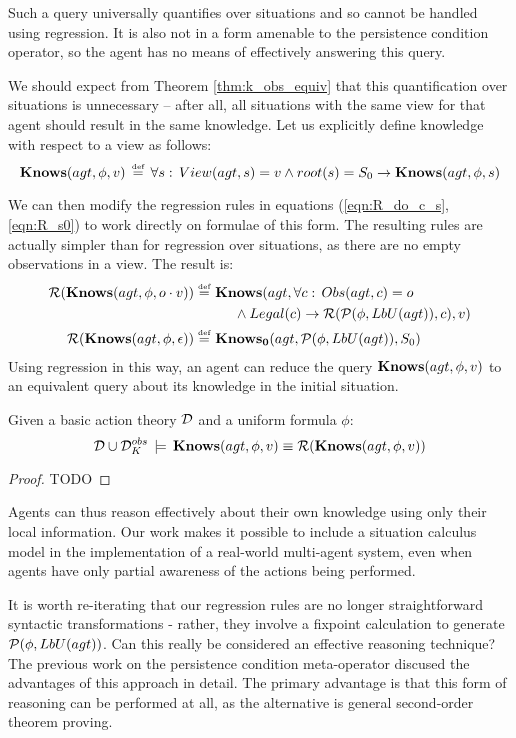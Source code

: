 Such a query universally quantifies over situations and so cannot
be handled using regression. It is also not in a form amenable to
the persistence condition operator, so the agent has no means of effectively
answering this query.

We should expect from Theorem \ref{thm:k_obs_equiv} that this quantification
over situations is unnecessary -- after all, all situations with the
same view for that agent should result in the same knowledge. Let
us explicitly define knowledge with respect to a view as follows:\[
\mathbf{Knows}(agt,\phi,v)\,\stackrel{\mbox{\tiny def}}{=}\,\forall s:\, View(agt,s)=v\wedge root(s)=S_{0}\rightarrow\mathbf{Knows}(agt,\phi,s)\]


We can then modify the regression rules in equations (\ref{eqn:R_do_c_s},\ref{eqn:R_s0})
to work directly on formulae of this form. The resulting rules are
actually simpler than for regression over situations, as there are
no empty observations in a view. The result is:\begin{align*}
\mathcal{R}(\mathbf{Knows}(agt,\phi,o\cdot v))\stackrel{\mbox{\tiny def}}{=}\,\, & \mathbf{Knows}(agt,\forall c:\, Obs(agt,c)=o\\
 & \,\,\,\,\,\,\,\,\wedge Legal(c)\rightarrow\mathcal{R}(\mathcal{P}(\phi,LbU(agt)),c),v)\\
\mathcal{R}(\mathbf{Knows}(agt,\phi,\epsilon))\stackrel{\mbox{\tiny def}}{=}\,\, & \mathbf{Knows_{0}}(agt,\mathcal{P}(\phi,LbU(agt)),S_{0})\end{align*}
 Using regression in this way, an agent can reduce the query $\mathbf{Knows}(agt,\phi,v)$
to an equivalent query about its knowledge in the initial situation.

\begin{thm}
\label{thm:Reg_KnowsO}Given a basic action theory $\mathcal{D}$ and a uniform
formula $\phi$:\[
\mathcal{D}\cup\mathcal{D}_{K}^{obs}\,\models\,\mathbf{Knows}(agt,\phi,v)\equiv\mathcal{R}(\mathbf{Knows}(agt,\phi,v))\]

\end{thm}
\begin{proof}
TODO 
\end{proof}
Agents can thus reason effectively about their own knowledge using
only their local information. Our work makes it possible to include
a situation calculus model in the implementation of a real-world multi-agent
system, even when agents have only partial awareness of the actions
being performed.

It is worth re-iterating that our regression rules are no longer straightforward
syntactic transformations - rather, they involve a fixpoint calculation
to generate $\mathcal{P}(\phi,LbU(agt))$. Can this really be considered
an effective reasoning technique? The previous work on the persistence
condition meta-operator discused the advantages of this approach in
detail. The primary advantage is that this form of reasoning can be
performed at all, as the alternative is general second-order theorem
proving.

